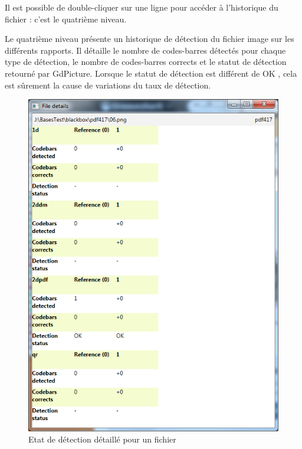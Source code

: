 Il est possible de double-cliquer sur une ligne pour accéder à l'historique du fichier : c'est le quatrième niveau.

\clearpage

Le quatrième niveau présente un historique de détection du fichier image sur les différents rapports. Il détaille le nombre de codes-barres détectés pour chaque type de détection, le nombre de codes-barres corrects et le statut de détection retourné par GdPicture. Lorsque le statut de détection est différent de \og OK \fg{}, cela est sûrement la cause de variations du taux de détection.

\begin{figure}
\begin{center}
\includegraphics[scale=0.6]{images/projet1RapportWindow4.png}
\end{center}
\caption{Etat de détection détaillé pour un fichier}
\label{niveau4}
\end{figure}


